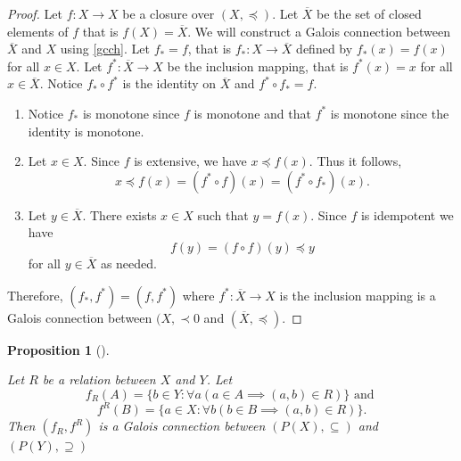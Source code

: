 \documentclass[
  twoside,
  12pt,
  letterpaper,
  fleqn]{article}
\theoremstyle{definition}
\theoremstyle{definition}
\theoremstyle{plain}
\newtheorem{proposition}{Proposition}[section]
\theoremstyle{remark}
\begin{document}
\begin{proof}

Let \(f:X\to X\) be a closure over \((X,\preceq)\). Let \(\overline{X}\)
be the set of closed elements of \(f\) that is \(f(X)=\overline{X}\). We
will construct a Galois connection between \(\overline{X}\) and \(X\)
using \eqref{gcch}. Let \(f_*=f\), that is \(f_*:X\to \overline{X}\)
defined by \(f_*(x)=f(x)\) for all \(x\in X\). Let
\(f^*:\overline{X}\to X\) be the inclusion mapping, that is \(f^*(x)=x\)
for all \(x\in \overline{X}\). Notice \(f_*\circ f^*\) is the identity
on \(\overline{X}\) and \(f^*\circ f_*=f\).

\begin{enumerate}
\item
Notice $f_*$ is monotone since $f$ is monotone and that $f^*$ is monotone since the identity is monotone. 
\item
Let $x\in X$. 
Since $f$ is extensive, we have $x\preceq f(x)$. 
Thus it follows,
\[
x\preceq f(x)=(f^*\circ f)(x)=(f^*\circ f_*)(x).
\]
\item
Let $y\in \overline{X}$. 
There exists $x\in X$ such that $y=f(x)$. 
Since $f$ is idempotent we have
\[
f(y)=(f\circ f)(y)\preceq y
\]
for all $y\in \overline{X}$ as needed.
\end{enumerate}

Therefore, \((f_*,f^*)=(f,f^*)\) where \(f^*:\overline{X}\to X\) is the
inclusion mapping is a Galois connection between \((X,\prec0\) and
\((\overline{X},\preceq)\).

\end{proof}

\begin{proposition}[]\protect\hypertarget{prp-}{}\label{prp-}

\label{gcrel} Let \(R\) be a relation between \(X\) and \(Y\). Let
\begin{equation}
\label{gcrel1}
f_R(A)=\{b\in Y:\forall a (a\in A\implies (a,b)\in R) \} \text{ and }
\end{equation} \begin{equation}
\label{gcrel2}
f^R(B)=\{a\in X:\forall b (b\in B\implies (a,b)\in R) \}.
\end{equation} Then \((f_R, f^R)\) is a Galois connection between
\((P(X),\subseteq)\) and \((P(Y),\supseteq)\)

\end{proposition}
\end{document}
